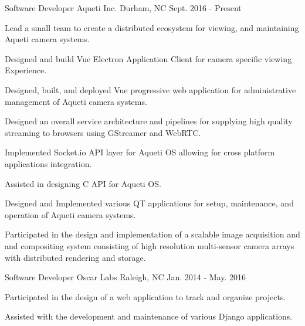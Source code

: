 

\begin{cventries}

  \cventry
    {Software Developer} %
    {Aqueti Inc.} %
    {Durham, NC} %
    {Sept. 2016 - Present} %
    {
      \begin{cvitems} %
        \item {Lead a small team to create a distributed ecosystem for viewing, and maintaining Aqueti camera systems.}
        \item {Designed and build Vue Electron Application Client for camera specific viewing Experience.}
        \item {Designed, built, and deployed Vue progressive web application for administrative management of Aqueti camera systems.}
        \item {Designed an overall service architecture and pipelines for supplying high quality streaming to browsers using GStreamer and WebRTC.}
        \item {Implemented Socket.io API layer for Aqueti OS allowing for cross platform applications integration.}
        \item {Assisted in designing C API for Aqueti OS.}
        \item {Designed and Implemented various QT applications for setup, maintenance, and operation of Aqueti camera systems.}
        \item {Participated in the design and implementation of a scalable image acquisition and and compositing system consisting of high resolution multi-sensor camera arrays with distributed rendering and storage.}
      \end{cvitems}
    }

  \cventry
    {Software Developer} %
    {Oscar Labs} %
    {Raleigh, NC} %
    {Jan. 2014 - May. 2016} %
    {
      \begin{cvitems} %
        \item {Participated in the design of a web application to track and organize projects.}
        \item {Assisted with the development and maintenance of various Django applications.}
      \end{cvitems}
    }

\end{cventries}
